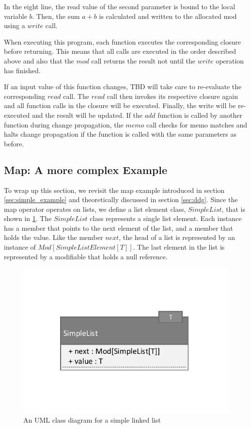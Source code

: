 In the eight line, the read value of the second parameter is bound to the local variable $b$. Then, the sum $a + b$ is calculated and written to the allocated mod using a $write$ call. 

When executing this program, each function executes the corresponding closure before returning. This means that all calls are executed in the order described above and also that the $mod$ call returns the result not until the $write$ operation has finished. 

If an input value of this function changes, TBD will take care to re-evaluate the corresponding $read$ call. The $read$ call then invokes its respective closure again and all function calls in the closure will be executed. Finally, the write will be re-executed and the result will be updated. If the $add$ function is called by another function during change propagation, the $memo$ call checks for memo matches and halts change propagation if the function is called with the same parameters as before. 

\subsection{Map: A more complex Example}
\label{sec:tbd_memo_map}

To wrap up this section, we revisit the map example introduced in section \ref{sec:simple_example} and theoretically discussed in section \ref{sec:ddg}. Since the map operator operates on lists, we define a list element class, $SimpleList$, that is shown in \ref{fig:simple_list_uml}. The $SimpleList$ class represents a single list element. Each instance has a member that points to the next element of the list, and a member that holds the value. Like the member $next$, the head of a list is represented by an instance of $Mod[SimpleListElement[T]]$. The last element in the list is represented by a modifiable that holds a null reference.  

\begin{figure}
\begin{center}
\includegraphics[scale=0.7]{uml/SimpleList.pdf}
\end{center}
\caption{An UML class diagram for a simple linked list}
\label{fig:simple_list_uml}
\end{figure}

